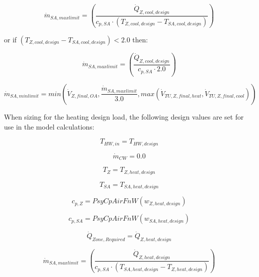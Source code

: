 \begin{equation}
  {\dot m_{SA,max limit}} = { \left(\frac{{\dot Q_{Z,cool,design } }}{{c_{p,SA}} \cdot {( {T_{Z,cool,design } } - {T_{SA,cool,design } } )}}  \right) }
\end{equation}  
  
or if \(({T_{Z,cool,design }} - {T_{SA,cool,design}}) < 2.0\) then:

\begin{equation}
  {\dot m_{SA,max limit}} = { \left(\frac{{\dot Q_{Z,cool,design } }}{{c_{p,SA}} \cdot 2.0 } \right) }
\end{equation}

\begin{equation}
  {\dot m_{SA,min limit}} = min( {\dot V_{Z,final,OA} }, \frac{{\dot m_{SA,max limit}}}{3.0}, max({\dot V_{TU,Z,final,heat} } , {\dot V_{TU,Z,final,cool} }) )
\end{equation}

When sizing for the heating design load, the following design values are set for use in the model calculations:

\begin{equation}
  {T_{HW,in}} = {T_{HW,design}}
\end{equation}

\begin{equation}
  {\dot m_{CW}} = {0.0}
\end{equation}

\begin{equation}
  {T_{Z}} = {T_{Z,heat,design } }
\end{equation}

\begin{equation}
  {T_{SA}} = {T_{SA,heat,design}}
\end{equation}

\begin{equation}
  {c_{p,Z}} = {PsyCpAirFnW({w_{Z,heat,design } }) }
\end{equation}

\begin{equation}
  {c_{p,SA}} = {PsyCpAirFnW ( {w_{SA,heat,design } }) }
\end{equation}

\begin{equation}
  {\dot Q_{Zone, Required}} = {\dot Q_{Z,heat,design } }
\end{equation}

\begin{equation}
  {\dot m_{SA,max limit}} = { \left(\frac{{\dot Q_{Z,heat,design } }}{{c_{p,SA}} \cdot ( {T_{SA,heat,design } } - {T_{Z,heat,design }} ) } \right) }
\end{equation}

